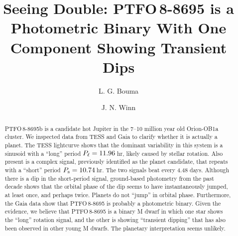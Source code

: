 \documentclass[12pt,twocolumn,tighten]{aastex62}
\begin{document}

\title{Seeing Double: PTFO$\,$8-8695 is a Photometric Binary With One
Component Showing Transient Dips }


%
%
\author[0000-0002-0514-5538]{L. G. Bouma}
%
\author[0000-0002-4265-047X]{J. N. Winn}

\begin{abstract}
  PTFO$\,$8-8695b is a candidate hot Jupiter in the 7--10 million year old
  Orion-OB1a cluster. We inspected data from TESS and Gaia to clarify whether
  it is actually a planet.  The TESS lightcurve shows that the dominant
  variability in this system is a sinusoid with a ``long'' period $P_{\rm
  \ell}=11.96\,$hr, likely caused by stellar rotation.  Also present is a
  complex signal, previously identified as the planet candidate, that repeats
  with a ``short'' period $P_{\rm s}= 10.74\,$hr.  The two signals beat every
  4.48 days.  Although there is a dip in the short-period signal, ground-based
  photometry from the past decade shows that the orbital phase of the dip seems
  to have instantaneously jumped, at least once, and perhaps twice.  Planets do
  not ``jump'' in orbital phase.  Furthermore, the Gaia data show that
  PTFO$\,$8-8695 is probably a photometric binary.  Given the evidence, we
  believe that PTFO$\,$8-8695 is a binary M dwarf in which one star shows the
  ``long'' rotation signal, and the other is showing ``transient dipping'' that
  has also been observed in other young M dwarfs.  The planetary interpretation
  seems unlikely.
\end{abstract}


\end{document}
